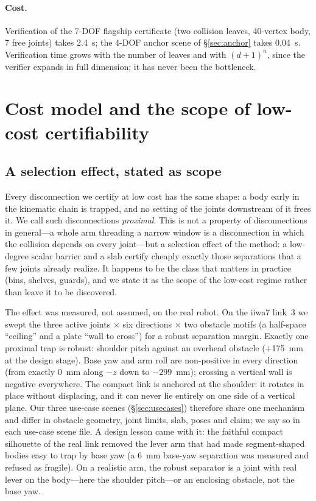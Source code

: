 \documentclass[10pt,twocolumn,letterpaper]{article}
\begin{document}
\paragraph{Cost.} Verification of the 7-DOF flagship certificate (two collision leaves, 40-vertex body, 7 free joints) takes 2.4~s; the 4-DOF anchor scene of \S\ref{sec:anchor} takes 0.04~s. Verification time grows with the number of leaves and with $(d+1)^n$, since the verifier expands in full dimension; it has never been the bottleneck.

\section{Cost model and the scope of low-cost certifiability}\label{sec:scope}

\subsection{A selection effect, stated as scope}
Every disconnection we certify at low cost has the same shape: a body early in the kinematic chain is trapped, and no setting of the joints downstream of it frees it. We call such disconnections \emph{proximal}. This is not a property of disconnections in general---a whole arm threading a narrow window is a disconnection in which the collision depends on every joint---but a selection effect of the method: a low-degree scalar barrier and a slab certify cheaply exactly those separations that a few joints already realize. It happens to be the class that matters in practice (bins, shelves, guards), and we state it as the scope of the low-cost regime rather than leave it to be discovered.

The effect was measured, not assumed, on the real robot. On the iiwa7 link~3 we swept the three active joints $\times$ six directions $\times$ two obstacle motifs (a half-space ``ceiling'' and a plate ``wall to cross'') for a robust separation margin. Exactly one proximal trap is robust: shoulder pitch against an overhead obstacle (+175~mm at the design stage). Base yaw and arm roll are non-positive in every direction (from exactly 0~mm along $-z$ down to $-299$~mm); crossing a vertical wall is negative everywhere. The compact link is anchored at the shoulder: it rotates in place without displacing, and it can never lie entirely on one side of a vertical plane. Our three use-case scenes (\S\ref{sec:usecases}) therefore share one mechanism and differ in obstacle geometry, joint limits, slab, poses and claim; we say so in each use-case scene file. A design lesson came with it: the faithful compact silhouette of the real link removed the lever arm that had made segment-shaped bodies easy to trap by base yaw (a 6~mm base-yaw separation was measured and refused as fragile). On a realistic arm, the robust separator is a joint with real lever on the body---here the shoulder pitch---or an enclosing obstacle, not the base yaw.
\end{document}
